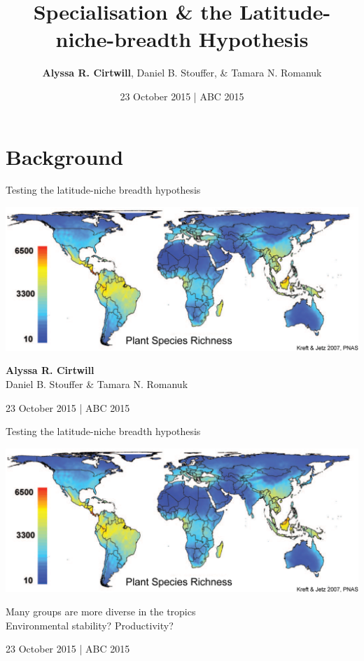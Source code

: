 \documentclass{beamer}
\title[Specialisation \& the Latitude-niche-breadth Hypothesis]
{Specialisation \& the Latitude-niche-breadth Hypothesis}
\author[A.R. Cirtwill, D.B. Stouffer, \& T.N. Romanuk]{\textbf{Alyssa R. Cirtwill}, Daniel B. Stouffer, \& Tamara N. Romanuk}
\institute[]
{
  Stouffer Lab\\
  School of Biological Sciences\\
  University of Canterbury\\
  Christchurch, New Zealand\\
  ~\\
  www.stoufferlab.org\\
}
\date[Short Occasion] 
{23 October 2015 | ABC 2015}
\begin{document}

\section*{Background}

  \begin{frame}{Testing the latitude-niche breadth hypothesis}

    \begin{center}
      \includegraphics*[width=.8\textwidth]{Figures/plant_richness.eps}

      \vspace{1cm}

    \textbf{Alyssa R. Cirtwill}\\ Daniel B. Stouffer \& Tamara N. Romanuk

    \vspace{1cm}

    23 October 2015 | ABC 2015

    \end{center}
  \end{frame}


  \begin{frame}{Testing the latitude-niche breadth hypothesis}

    \begin{center}
      \includegraphics*[width=.8\textwidth]{Figures/plant_richness.eps}

      \vspace{.5cm}

      Many groups are more diverse in the tropics\\
      \vspace{.5cm}
      {\color{white} Environmental stability? Productivity?\\}

      \vspace{1cm}

      {\color{white}23 October 2015 | ABC 2015}

    \end{center}
  \end{frame}
\end{document}
